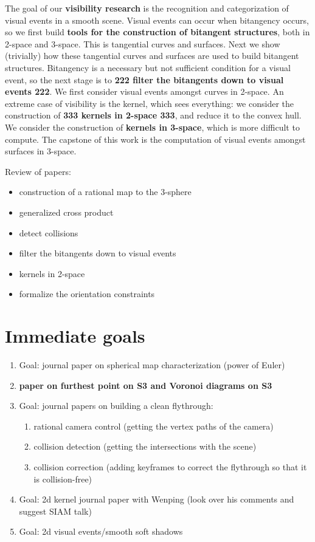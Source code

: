 \documentclass[12pt]{article}
\begin{document}
The goal of our {\bf visibility research} is the recognition and categorization of visual events
in a smooth scene.
Visual events can occur when bitangency occurs, so we first build {\bf tools for the construction
of bitangent structures}, both in 2-space and 3-space.
This is tangential curves and surfaces.
Next we show (trivially) how these tangential curves and surfaces are used to build bitangent
structures.
Bitangency is a necessary but not sufficient condition for a visual event, so the next stage
is to {\large {\bf 222 filter the bitangents down to visual events 222}}.
We first consider visual events amongst curves in 2-space.
An extreme case of visibility is the kernel, which sees everything: we consider the construction
of {\large {\bf 333 kernels in 2-space 333}}, and reduce it to the convex hull.
We consider the construction of {\bf kernels in 3-space}, which is more difficult to compute.
The capstone of this work is the computation of visual events amongst surfaces in 3-space.

Review of papers:

\begin{itemize}
\item construction of a rational map to the 3-sphere
\item generalized cross product 
\item detect collisions 
\item filter the bitangents down to visual events 
\item kernels in 2-space
\item formalize the orientation constraints 
\end{itemize}

\clearpage

\section{Immediate goals}

\begin{enumerate}
\item Goal: journal paper on spherical map characterization (power of Euler)
\item {\bf paper on furthest point on S3 and Voronoi diagrams on S3}
\item Goal: journal papers on building a clean flythrough: 
\begin{enumerate}
\item rational camera control (getting the vertex paths of the camera)
\item collision detection (getting the intersections with the scene)
\item collision correction (adding keyframes to correct the flythrough 
          so that it is collision-free)
\end{enumerate}
\item Goal: 2d kernel journal paper with Wenping (look over his comments and suggest SIAM talk)
\item Goal: 2d visual events/smooth soft shadows
\end{enumerate}
\end{document}
